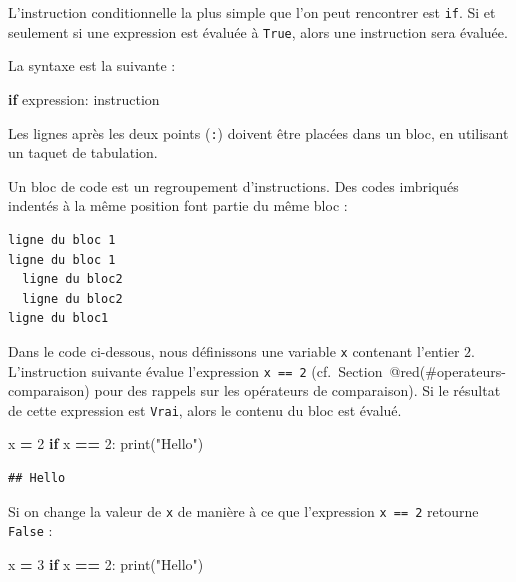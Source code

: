 \documentclass[12pt,]{book}
\newenvironment{Shaded}{\begin{snugshade}}{\end{snugshade}}
\newcommand{\DecValTok}[1]{\textcolor[rgb]{0.00,0.00,0.81}{#1}}
\newcommand{\StringTok}[1]{\textcolor[rgb]{0.31,0.60,0.02}{#1}}
\newcommand{\ControlFlowTok}[1]{\textcolor[rgb]{0.13,0.29,0.53}{\textbf{#1}}}
\newcommand{\OperatorTok}[1]{\textcolor[rgb]{0.81,0.36,0.00}{\textbf{#1}}}
\newcommand{\BuiltInTok}[1]{#1}
\newcommand{\NormalTok}[1]{#1}
\numberwithin{equation}{section}
\numberwithin{countremarque}{section}
\let\BeginKnitrBlock\begin \let\EndKnitrBlock\end
\begin{document}
L'instruction conditionnelle la plus simple que l'on peut rencontrer est
\texttt{if}. Si et seulement si une expression est évaluée à
\texttt{True}, alors une instruction sera évaluée.

La syntaxe est la suivante :

\begin{Shaded}
\begin{Highlighting}[]
\ControlFlowTok{if}\NormalTok{ expression:}
\NormalTok{  instruction}
\end{Highlighting}
\end{Shaded}

Les lignes après les deux points (\texttt{:}) doivent être placées dans
un bloc, en utilisant un taquet de tabulation.

\BeginKnitrBlock{remarque}
Un bloc de code est un regroupement d'instructions. Des codes imbriqués
indentés à la même position font partie du même bloc :

\begin{lstlisting}
ligne du bloc 1
ligne du bloc 1
  ligne du bloc2
  ligne du bloc2
ligne du bloc1
\end{lstlisting}
\EndKnitrBlock{remarque}

Dans le code ci-dessous, nous définissons une variable \texttt{x}
contenant l'entier \(2\). L'instruction suivante évalue l'expression
\texttt{x\ ==\ 2} (cf.~Section~@red(\#operateurs-comparaison) pour des
rappels sur les opérateurs de comparaison). Si le résultat de cette
expression est \texttt{Vrai}, alors le contenu du bloc est évalué.

\begin{Shaded}
\begin{Highlighting}[]
\NormalTok{x }\OperatorTok{=} \DecValTok{2}
\ControlFlowTok{if}\NormalTok{ x }\OperatorTok{==} \DecValTok{2}\NormalTok{:}
  \BuiltInTok{print}\NormalTok{(}\StringTok{"Hello"}\NormalTok{)}
\end{Highlighting}
\end{Shaded}

\begin{lstlisting}
## Hello
\end{lstlisting}

Si on change la valeur de \texttt{x} de manière à ce que l'expression
\texttt{x\ ==\ 2} retourne \texttt{False} :

\begin{Shaded}
\begin{Highlighting}[]
\NormalTok{x }\OperatorTok{=} \DecValTok{3}
\ControlFlowTok{if}\NormalTok{ x }\OperatorTok{==} \DecValTok{2}\NormalTok{:}
  \BuiltInTok{print}\NormalTok{(}\StringTok{"Hello"}\NormalTok{)}
\end{Highlighting}
\end{Shaded}
\end{document}
